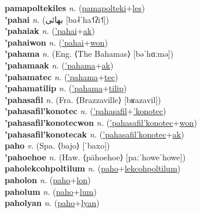 \textbf{pamapoltekiles} \textit{n.} (\hyperref[pamapolteki]{pamapolteki}+\hyperref[les]{les})
 \label{pamapoltekiles} \\
\textbf{'pahai} \textit{n.} ({\arabics{}بهائی‎} [ba˨ˈha˦ʔi˦])
 \label{'pahai} \\
\textbf{'pahaiak} \textit{n.} (\hyperref['pahai]{'pahai}+\hyperref[ak]{ak})
 \label{'pahaiak} \\
\textbf{'pahaiwon} \textit{n.} (\hyperref['pahai]{'pahai}+\hyperref[won]{won})
 \label{'pahaiwon} \\
\textbf{'pahama} \textit{n.} (Eng. ⟨The Bahamas⟩ [bəˈhɑːmə])
 \label{'pahama} \\
\textbf{'pahamaak} \textit{n.} (\hyperref['pahama]{'pahama}+\hyperref[ak]{ak})
 \label{'pahamaak} \\
\textbf{'pahamatec} \textit{n.} (\hyperref['pahama]{'pahama}+\hyperref[tec]{tec})
 \label{'pahamatec} \\
\textbf{'pahamatilip} \textit{n.} (\hyperref['pahama]{'pahama}+\hyperref[tilip]{tilip})
 \label{'pahamatilip} \\
\textbf{'pahasafil} \textit{n.} (Fra. ⟨Brazzaville⟩ [bʁazavil])
 \label{'pahasafil} \\
\textbf{'pahasafil'konotec} \textit{n.} (\hyperref['pahasafil]{'pahasafil}+\hyperref['konotec]{'konotec})
 \label{'pahasafil'konotec} \\
\textbf{'pahasafil'konotecwon} \textit{n.} (\hyperref['pahasafil'konotec]{'pahasafil'konotec}+\hyperref[won]{won})
 \label{'pahasafil'konotecwon} \\
\textbf{'pahasafil'konotecak} \textit{n.} (\hyperref['pahasafil'konotec]{'pahasafil'konotec}+\hyperref[ak]{ak})
 \label{'pahasafil'konotecak} \\
\textbf{paho} \textit{v.} (Spa. ⟨bajo⟩ [ˈbaxo])
 \label{paho} \\
\textbf{'pahoehoe} \textit{n.} (Haw. ⟨pāhoehoe⟩ [paːˈhoweˈhowe])
 \label{'pahoehoe} \\
\textbf{paholekcohpoltilum} \textit{n.} (\hyperref[paho]{paho}+\hyperref[lekcohpoltilum]{lekcohpoltilum})
 \label{paholekcohpoltilum} \\
\textbf{paholon} \textit{n.} (\hyperref[paho]{paho}+\hyperref[lon]{lon})
 \label{paholon} \\
\textbf{paholum} \textit{n.} (\hyperref[paho]{paho}+\hyperref[lum]{lum})
 \label{paholum} \\
\textbf{paholyan} \textit{n.} (\hyperref[paho]{paho}+\hyperref[lyan]{lyan})
 \label{paholyan} \\
